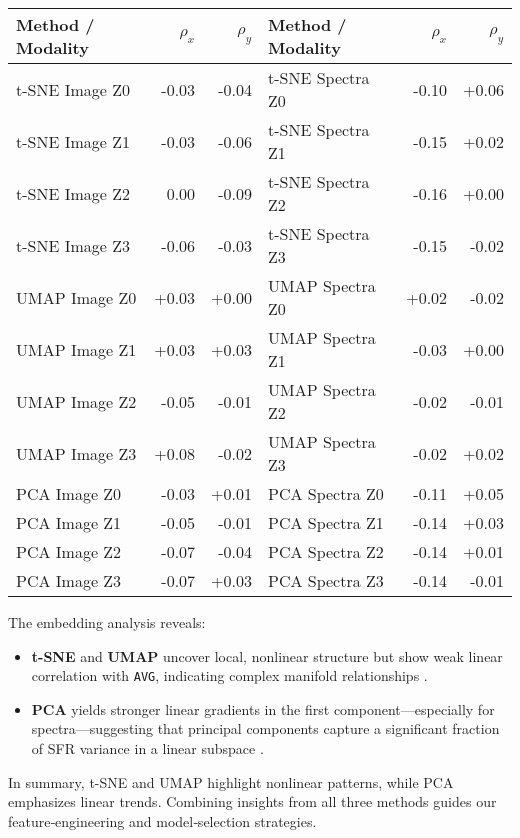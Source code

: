 \documentclass[english,bachelor,oneside]{ctufit-thesis}
\begin{document}
\begin{center}
\begin{tabular}{lrr|lrr}
\toprule
\textbf{Method / Modality}     & $\rho_x$ & $\rho_y$  & \textbf{Method / Modality}     & $\rho_x$ & $\rho_y$ \\
\midrule
t-SNE Image Z0 & -0.03 & -0.04 & t-SNE Spectra Z0 & -0.10 & +0.06 \\
t-SNE Image Z1 & -0.03 & -0.06 & t-SNE Spectra Z1 & -0.15 & +0.02 \\
t-SNE Image Z2 &  0.00 & -0.09 & t-SNE Spectra Z2 & -0.16 & +0.00 \\
t-SNE Image Z3 & -0.06 & -0.03 & t-SNE Spectra Z3 & -0.15 & -0.02 \\
\midrule
UMAP Image Z0 & +0.03 & +0.00 & UMAP Spectra Z0 & +0.02 & -0.02 \\
UMAP Image Z1 & +0.03 & +0.03 & UMAP Spectra Z1 & -0.03 & +0.00 \\
UMAP Image Z2 & -0.05 & -0.01 & UMAP Spectra Z2 & -0.02 & -0.01 \\
UMAP Image Z3 & +0.08 & -0.02 & UMAP Spectra Z3 & -0.02 & +0.02 \\
\midrule
PCA Image Z0  & -0.03 & +0.01 & PCA Spectra Z0  & -0.11 & +0.05 \\
PCA Image Z1  & -0.05 & -0.01 & PCA Spectra Z1  & -0.14 & +0.03 \\
PCA Image Z2  & -0.07 & -0.04 & PCA Spectra Z2  & -0.14 & +0.01 \\
PCA Image Z3  & -0.07 & +0.03 & PCA Spectra Z3  & -0.14 & -0.01 \\
\bottomrule
\end{tabular}
\end{center}

\noindent The embedding analysis reveals:
\begin{itemize}
  \item \textbf{t-SNE} and \textbf{UMAP} uncover local, nonlinear structure but show weak linear correlation with \texttt{AVG}, indicating complex manifold relationships \cite{maaten2008visualizing,mcinnes2018umap}.
  \item \textbf{PCA} yields stronger linear gradients in the first component—especially for spectra—suggesting that principal components capture a significant fraction of SFR variance in a linear subspace \cite{jolliffe2002principal}.
\end{itemize}

In summary, t-SNE and UMAP highlight nonlinear patterns, while PCA emphasizes linear trends. Combining insights from all three methods guides our feature‐engineering and model‐selection strategies.
\end{document}
